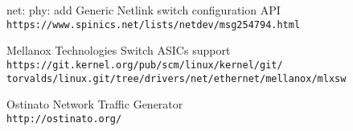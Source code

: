 \documentclass[letterpaper]{article}
\begin{document}
\begin{thebibliography}{2}
net: phy: add Generic Netlink switch configuration API\\
\texttt{https://www.spinics.net/lists/netdev/msg254794.html}

Mellanox Technologies Switch ASICs support\\
\texttt{https://git.kernel.org/pub/scm/linux/kernel/git/\\
  torvalds/linux.git/tree/drivers/net/ethernet/mellanox/mlxsw}

  Ostinato Network Traffic Generator\\
  \texttt{http://ostinato.org/}

\end{thebibliography}
\end{document}
